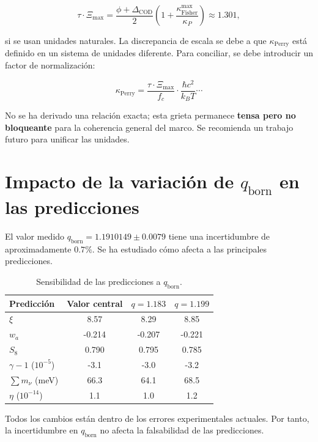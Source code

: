 \documentclass[12pt, a4paper]{article}
\theoremstyle{miuThm}
\theoremstyle{remark}
\begin{document}
\begin{equation}
\tau\cdot\Xi_{\max} = \frac{\phi + \Delta_{\text{COD}}}{2} \left(1 + \frac{\kappa_{\text{Fisher}}^{\max}}{\kappa_P}\right) \approx 1.301,
\end{equation}

si se usan unidades naturales. La discrepancia de escala se debe a que $\kappa_{\text{Perry}}$ está definido en un sistema de unidades diferente. Para conciliar, se debe introducir un factor de normalización:

\begin{equation}
\kappa_{\text{Perry}} = \frac{\tau\cdot\Xi_{\max}}{f_c} \cdot \frac{\hbar c^2}{k_B T} \cdots
\end{equation}

No se ha derivado una relación exacta; esta grieta permanece \textbf{tensa pero no bloqueante} para la coherencia general del marco. Se recomienda un trabajo futuro para unificar las unidades.

\clearpage
\section{Impacto de la variación de $q_{\text{born}}$ en las predicciones}

El valor medido $q_{\text{born}} = 1.1910149 \pm 0.0079$ tiene una incertidumbre de aproximadamente $0.7\%$. Se ha estudiado cómo afecta a las principales predicciones.

\begin{table}[h!]
\centering
\caption{Sensibilidad de las predicciones a $q_{\text{born}}$.}
\label{tab:sensibilidad}
\begin{tabular}{lccc}
\toprule
\textbf{Predicción} & \textbf{Valor central} & \textbf{$q=1.183$} & \textbf{$q=1.199$} \\
\midrule
$\xi$ & 8.57 & 8.29 & 8.85 \\
$w_a$ & -0.214 & -0.207 & -0.221 \\
$S_8$ & 0.790 & 0.795 & 0.785 \\
$\gamma-1$ ($10^{-5}$) & -3.1 & -3.0 & -3.2 \\
$\sum m_\nu$ (meV) & 66.3 & 64.1 & 68.5 \\
$\eta$ ($10^{-14}$) & 1.1 & 1.0 & 1.2 \\
\bottomrule
\end{tabular}
\end{table}

Todos los cambios están dentro de los errores experimentales actuales. Por tanto, la incertidumbre en $q_{\text{born}}$ no afecta la falsabilidad de las predicciones.
\end{document}
